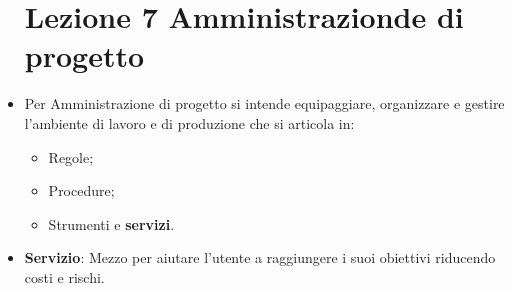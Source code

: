 \documentclass[a4paper,10pt] {article}
\begin{document}
\begin{itemize}
\begin{itemize}
	
\end{itemize}


\section{Lezione 7 Amministrazionde di progetto}

	\item Per Amministrazione di progetto si intende equipaggiare, organizzare 
	e gestire l'ambiente di lavoro e di produzione che si articola in:
		\begin{itemize}
			\item Regole;
			\item Procedure;
			\item Strumenti e \textbf{servizi}.
		\end{itemize} 
	\item \textbf{Servizio}: Mezzo per aiutare l'utente a raggiungere i suoi 
	obiettivi riducendo costi e rischi.
	

\end{itemize}
\end{document}
